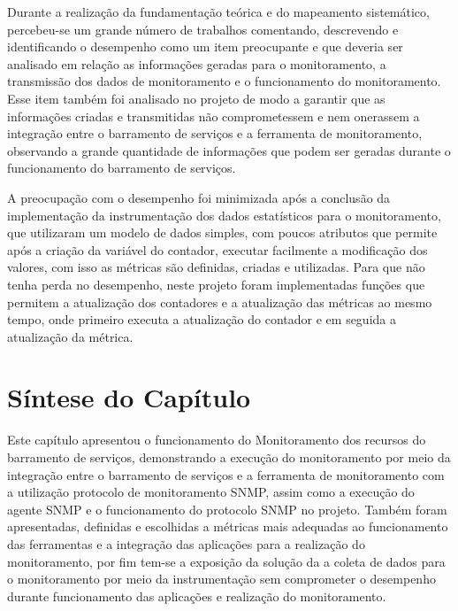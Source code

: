 Durante a realização da fundamentação teórica e do mapeamento sistemático, percebeu-se um grande número de trabalhos comentando, descrevendo e identificando o desempenho como um item preocupante e que deveria ser analisado em relação as informações geradas para o monitoramento, a transmissão dos dados de monitoramento e o funcionamento do monitoramento.  Esse item também foi analisado no projeto de modo a garantir que as informações criadas e transmitidas não comprometessem e nem onerassem a integração entre o barramento de serviços e a ferramenta de monitoramento, observando a grande quantidade de informações que podem ser geradas durante o funcionamento do barramento de serviços. 

A preocupação com  o desempenho foi minimizada após a conclusão  da implementação da instrumentação dos dados estatísticos para o monitoramento, que utilizaram um modelo de dados simples, com poucos atributos que permite após a criação da variável do contador, executar facilmente a  modificação dos valores, com isso as métricas são definidas,  criadas e utilizadas. Para que não tenha perda no desempenho, neste projeto foram implementadas funções que permitem a atualização dos contadores e a atualização das métricas ao mesmo tempo, onde primeiro executa a atualização do contador e em seguida a atualização da métrica.      


\section{Síntese do Capítulo}
\label{sintese4}

Este capítulo apresentou o funcionamento do Monitoramento dos recursos do barramento de serviços, demonstrando a execução do monitoramento por meio da integração entre o barramento de serviços e a ferramenta de monitoramento com a utilização protocolo de monitoramento \acrshort{SNMP}, assim como a execução do agente \acrshort{SNMP} e o funcionamento do protocolo \acrshort{SNMP} no projeto. Também foram apresentadas, definidas e escolhidas a métricas mais adequadas ao funcionamento das ferramentas e a integração das aplicações para a realização do monitoramento, por fim tem-se a exposição da solução da a coleta de dados para o monitoramento por meio da instrumentação sem comprometer o desempenho durante funcionamento das aplicações e realização do monitoramento. 